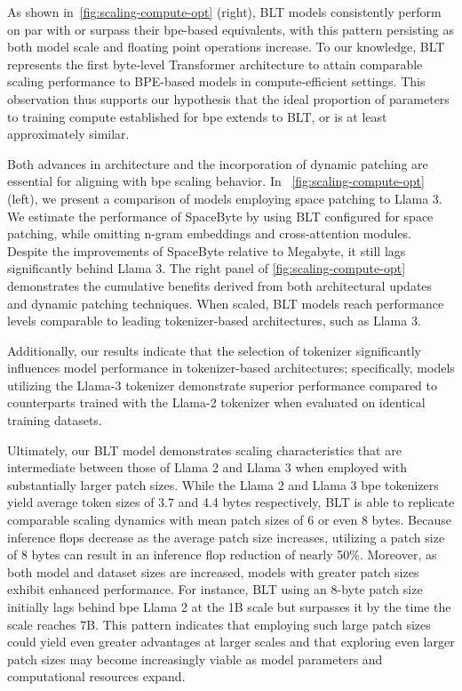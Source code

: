As shown in~\autoref{fig:scaling-compute-opt} (right), {\textsc BLT} models consistently perform on par with or surpass their bpe-based equivalents, with this pattern persisting as both model scale and floating point operations increase. To our knowledge, {\textsc BLT} represents the first byte-level Transformer architecture to attain comparable scaling performance to BPE-based models in compute-efficient settings. This observation thus supports our hypothesis that the ideal proportion of parameters to training compute established for bpe extends to {\textsc BLT}, or is at least approximately similar.

Both advances in architecture and the incorporation of dynamic patching are essential for aligning with bpe scaling behavior. In ~\autoref{fig:scaling-compute-opt} (left), we present a comparison of models employing space patching to Llama 3. We estimate the performance of SpaceByte \citep{slagle2024spacebyte} by using {\textsc BLT} configured for space patching, while omitting n-gram embeddings and cross-attention modules. Despite the improvements of SpaceByte relative to Megabyte, it still lags significantly behind Llama 3. The right panel of \autoref{fig:scaling-compute-opt} demonstrates the cumulative benefits derived from both architectural updates and dynamic patching techniques. When scaled, {\textsc BLT} models reach performance levels comparable to leading tokenizer-based architectures, such as Llama 3.

Additionally, our results indicate that the selection of tokenizer significantly influences model performance in tokenizer-based architectures; specifically, models utilizing the Llama-3 tokenizer demonstrate superior performance compared to counterparts trained with the Llama-2 tokenizer when evaluated on identical training datasets.

Ultimately, our {\textsc BLT} model demonstrates scaling characteristics that are intermediate between those of Llama 2 and Llama 3 when employed with substantially larger patch sizes. While the Llama 2 and Llama 3 bpe tokenizers yield average token sizes of 3.7 and 4.4 bytes respectively, {\textsc BLT} is able to replicate comparable scaling dynamics with mean patch sizes of 6 or even 8 bytes. Because inference flops decrease as the average patch size increases, utilizing a patch size of 8 bytes can result in an inference flop reduction of nearly 50\%. Moreover, as both model and dataset sizes are increased, models with greater patch sizes exhibit enhanced performance. For instance, {\textsc BLT} using an 8-byte patch size initially lags behind bpe Llama 2 at the 1B scale but surpasses it by the time the scale reaches 7B. This pattern indicates that employing such large patch sizes could yield even greater advantages at larger scales and that exploring even larger patch sizes may become increasingly viable as model parameters and computational resources expand.

